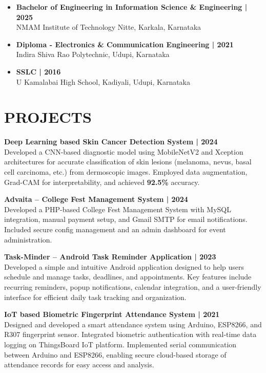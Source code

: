 \documentclass[10pt, a4paper]{article}
\newcommand{\projecttitle}[2]{%
    {\fontsize{12pt}{14pt}\selectfont\textbf{#1 | #2}}\\[\parskip] %
}
\newcommand{\bodyfont}{\fontsize{10pt}{12pt}\selectfont\setstretch{1.5}} %
\begin{document}
{\bodyfont
\begin{itemize}
    \item \textbf{Bachelor of Engineering in Information Science \& Engineering | 2025} \\[-0.5em]
    NMAM Institute of Technology Nitte, Karkala, Karnataka

    \item \textbf{Diploma - Electronics \& Communication Engineering | 2021} \\[-0.5em]
    Indira Shiva Rao Polytechnic, Udupi, Karnataka

    \item \textbf{SSLC | 2016} \\[-0.5em]
    U Kamalabai High School, Kadiyali, Udupi, Karnataka
\end{itemize}
}

\section*{PROJECTS}

\projecttitle{Deep Learning based Skin Cancer Detection System}{2024}
{\bodyfont
\justifying
Developed a CNN-based diagnostic model using MobileNetV2 and Xception architectures for accurate classification of skin lesions (melanoma, nevus, basal cell carcinoma, etc.) from dermoscopic images. Employed data augmentation, Grad-CAM for interpretability, and achieved \textbf{92.5\%} accuracy.
}

\projecttitle{Advaita – College Fest Management System}{2024}
{\bodyfont
\justifying
Developed a PHP-based College Fest Management System with MySQL integration, manual payment setup, and Gmail SMTP for email notifications. Included secure config management and an admin dashboard for event administration.
}

\projecttitle{Task-Minder – Android Task Reminder Application}{2023}
{\bodyfont
\justifying
Developed a simple and intuitive Android application designed to help users schedule and manage tasks, deadlines, and appointments. Key features include recurring reminders, popup notifications, calendar integration, and a user-friendly interface for efficient daily task tracking and organization.
}

\projecttitle{IoT based Biometric Fingerprint Attendance System}{2021}
{\bodyfont
\justifying
Designed and developed a smart attendance system using Arduino, ESP8266, and R307 fingerprint sensor. Integrated biometric authentication with real-time data logging on ThingsBoard IoT platform. Implemented serial communication between Arduino and ESP8266, enabling secure cloud-based storage of attendance records for easy access and analysis.
}
\end{document}
